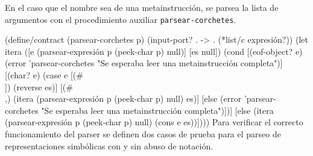 \documentclass[10pt,oneside,openany,letterpaper]{book}
\begin{document}
En el caso que el nombre sea de una metainstrucción, se parsea la lista de argumentos con el procedimiento auxiliar {\tt{}\protect{}parsear\protect{}-corchetes}.

\nwenddocs{}\plusendmoddef
(define/contract (parsear-corchetes p)
  (input-port? . -> . (*list/c expresión?))
  (let itera ([e  (parsear-expresión p (peek-char p) null)]
              [es null])
    (cond [(eof-object? e)
           (error 'parsear-corchetes
                  "Se esperaba leer una metainstrucción completa")]
          [(char? e)
           (case e
             [(#\\]) (reverse es)]
             [(#\\,) (itera (parsear-expresión p (peek-char p) null) es)]
             [else
              (error 'parsear-corchetes
                     "Se esperaba leer una metainstrucción completa")])]
          [else
           (itera (parsear-expresión p (peek-char p) null)
                  (cons e es))])))
\eatline
{}\nwendcode{}\nwdocspar
Para verificar el correcto funcionamiento del parser se definen dos casos de prueba para el parseo de representaciones simbólicas con y sin abuso de notación.
\end{document}
